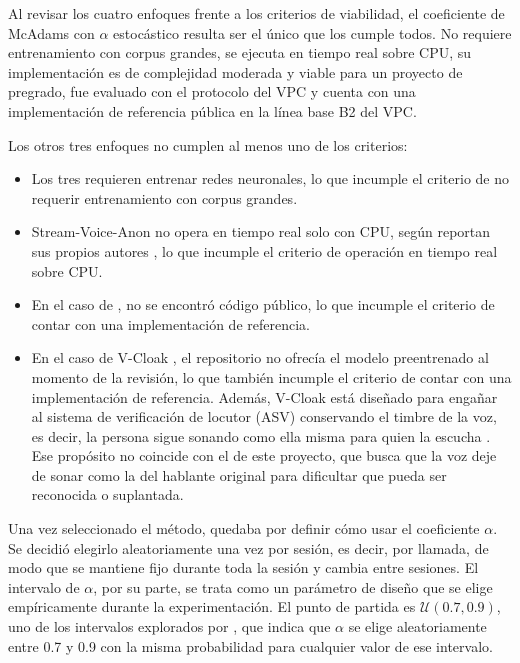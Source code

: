 \documentclass[10pt,twocolumn]{article}
\newcommand{\textcite}[1]{\citet{#1}}
\newcommand{\parencite}[1]{\citep{#1}}
\begin{document}
Al revisar los cuatro enfoques frente a los criterios de viabilidad, el coeficiente de McAdams con $\alpha$ estocástico resulta ser el único que los cumple todos. No requiere entrenamiento con corpus grandes, se ejecuta en tiempo real sobre CPU, su implementación es de complejidad moderada y viable para un proyecto de pregrado, fue evaluado con el protocolo del VPC y cuenta con una implementación de referencia pública en la línea base B2 del VPC.

Los otros tres enfoques no cumplen al menos uno de los criterios:

\begin{itemize}
\item Los tres requieren entrenar redes neuronales, lo que incumple el criterio de no requerir entrenamiento con corpus grandes.
\item Stream-Voice-Anon no opera en tiempo real solo con CPU, según reportan sus propios autores \parencite{kuzmin2026}, lo que incumple el criterio de operación en tiempo real sobre CPU.
\item En el caso de \textcite{quamer2024}, no se encontró código público, lo que incumple el criterio de contar con una implementación de referencia.
\item En el caso de V-Cloak \parencite{deng2023}, el repositorio no ofrecía el modelo preentrenado al momento de la revisión, lo que también incumple el criterio de contar con una implementación de referencia. Además, V-Cloak está diseñado para engañar al sistema de verificación de locutor (ASV) conservando el timbre de la voz, es decir, la persona sigue sonando como ella misma para quien la escucha \parencite{deng2023}. Ese propósito no coincide con el de este proyecto, que busca que la voz deje de sonar como la del hablante original para dificultar que pueda ser reconocida o suplantada.
\end{itemize}

Una vez seleccionado el método, quedaba por definir cómo usar el coeficiente $\alpha$. Se decidió elegirlo aleatoriamente una vez por sesión, es decir, por llamada, de modo que se mantiene fijo durante toda la sesión y cambia entre sesiones. El intervalo de $\alpha$, por su parte, se trata como un parámetro de diseño que se elige empíricamente durante la experimentación. El punto de partida es $\mathcal{U}(0.7,0.9)$, uno de los intervalos explorados por \textcite{patino2021}, que indica que $\alpha$ se elige aleatoriamente entre 0.7 y 0.9 con la misma probabilidad para cualquier valor de ese intervalo.
\end{document}
